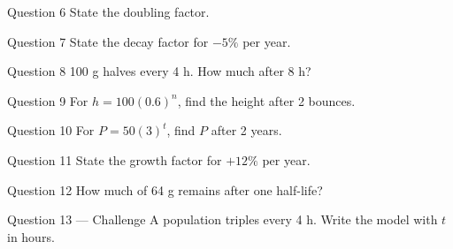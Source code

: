 \documentclass[11pt]{article}
\begin{document}
\begin{qbox}{Question 6}
State the doubling factor.\workspace{2.4cm}
\end{qbox}

\begin{qbox}{Question 7}
State the decay factor for $-5\%$ per year.\workspace{2.4cm}
\end{qbox}

\begin{qbox}{Question 8}
100 g halves every 4 h. How much after 8 h?\workspace{2.4cm}
\end{qbox}

\begin{qbox}{Question 9}
For $h=100(0.6)^n$, find the height after 2 bounces.\workspace{2.4cm}
\end{qbox}

\begin{qbox}{Question 10}
For $P=50(3)^t$, find $P$ after 2 years.\workspace{2.4cm}
\end{qbox}

\begin{qbox}{Question 11}
State the growth factor for $+12\%$ per year.\workspace{2.4cm}
\end{qbox}

\begin{qbox}{Question 12}
How much of 64 g remains after one half-life?\workspace{2.4cm}
\end{qbox}

\begin{qbox}{Question 13 --- Challenge}
A population triples every 4 h. Write the model with $t$ in hours.\workspace{3cm}
\end{qbox}

\clearpage
{}
\end{document}
